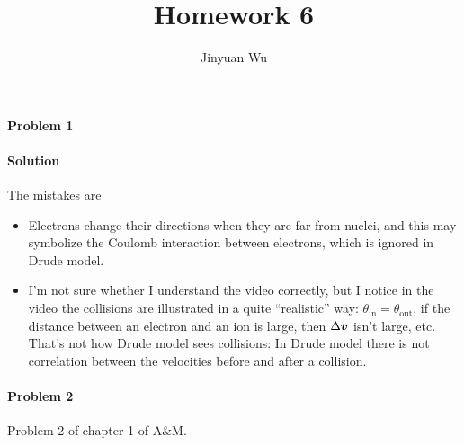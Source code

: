\documentclass[hyperref, a4paper]{article}
\title{Homework 6}
\author{Jinyuan Wu}
\begin{document}
\maketitle

\paragraph{Problem 1} 

\paragraph{Solution} The mistakes are
\begin{itemize}
    \item Electrons change their directions when they are far from nuclei,
    and this may symbolize the Coulomb interaction between electrons,
    which is ignored in Drude model.
    \item I'm not sure whether I understand the video correctly,
    but I notice in the video the collisions are illustrated in a quite ``realistic'' way:
    $\theta_{\text{in}} = \theta_{\text{out}}$,
    if the distance between an electron and an ion is large, then $\Delta \vb*{v}$ isn't large, etc.
    That's not how Drude model sees collisions:
    In Drude model there is not correlation between the velocities before and after a collision.
\end{itemize}

\paragraph{Problem 2} Problem 2 of chapter 1 of A\&M.
\end{document}
